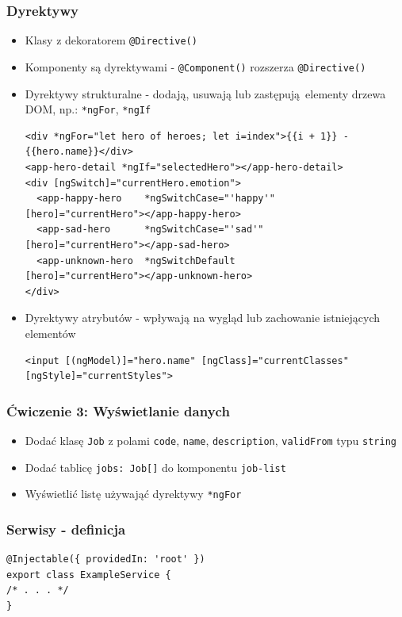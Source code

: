 \documentclass{beamer}
\begin{document}
\begin{frame}[fragile]
    \frametitle{Dyrektywy}
    \begin{itemize}
        \item Klasy z dekoratorem \lstinline{@Directive()}
        \item Komponenty są dyrektywami - \lstinline{@Component()} rozszerza \lstinline{@Directive()}
        \item Dyrektywy strukturalne - dodają, usuwają lub zastępują elementy drzewa DOM, np.: \lstinline{*ngFor}, \lstinline{*ngIf}
\begin{lstlisting}
<div *ngFor="let hero of heroes; let i=index">{{i + 1}} - {{hero.name}}</div>
<app-hero-detail *ngIf="selectedHero"></app-hero-detail>
<div [ngSwitch]="currentHero.emotion">
  <app-happy-hero    *ngSwitchCase="'happy'"    [hero]="currentHero"></app-happy-hero>
  <app-sad-hero      *ngSwitchCase="'sad'"      [hero]="currentHero"></app-sad-hero>
  <app-unknown-hero  *ngSwitchDefault           [hero]="currentHero"></app-unknown-hero>
</div>
\end{lstlisting}
        \item Dyrektywy atrybutów - wpływają na wygląd lub zachowanie istniejących elementów
\begin{lstlisting}
<input [(ngModel)]="hero.name" [ngClass]="currentClasses" [ngStyle]="currentStyles">
\end{lstlisting}
    \end{itemize}
\end{frame}

\begin{frame}
    \frametitle{Ćwiczenie 3: Wyświetlanie danych}
    \begin{itemize}
        \item Dodać klasę \lstinline{Job} z polami \lstinline{code}, \lstinline{name}, \lstinline{description}, \lstinline{validFrom} typu \lstinline{string}
        \item Dodać tablicę \lstinline{jobs: Job[]} do komponentu \lstinline{job-list}
        \item Wyświetlić listę używająć dyrektywy \lstinline{*ngFor}
    \end{itemize}
\end{frame}

\begin{frame}[fragile]
    \frametitle{Serwisy - definicja}
\begin{lstlisting}
@Injectable({ providedIn: 'root' })
export class ExampleService {
/* . . . */
}
\end{lstlisting}
\end{frame}
\end{document}
